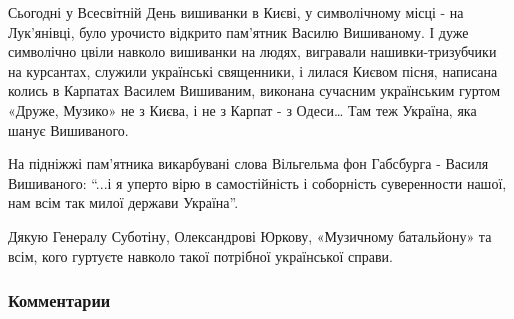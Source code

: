 Сьогодні у Всесвітній День вишиванки в Києві, у символічному місці - на
Лук'янівці, було урочисто відкрито пам'ятник Василю Вишиваному. І дуже
символічно цвіли навколо вишиванки на людях, вигравали нашивки-тризубчики на
курсантах, служили українські священники, і лилася Києвом пісня, написана
колись в Карпатах Василем Вишиваним, виконана сучасним українським гуртом
«Друже, Музико» не з Києва, і не з Карпат - з Одеси… Там теж Україна, яка шанує
Вишиваного. 

На підніжжі пам'ятника викарбувані слова Вільгельма фон Габсбурга - Василя
Вишиваного: \enquote{...і я уперто вірю в самостійність і соборність суверенности
нашої, нам всім так милої держави Україна}.

Дякую Генералу Суботіну, Олександрові Юркову, «Музичному батальйону» та всім,
кого гуртуєте навколо такої потрібної української справи.

\subsubsection{Комментарии}

